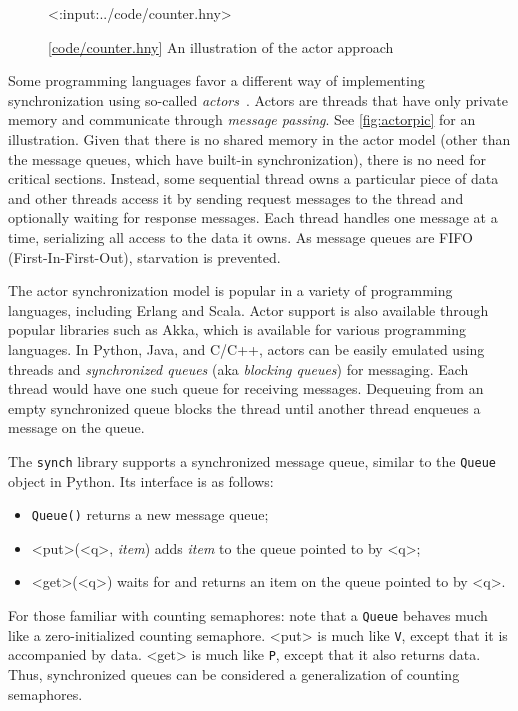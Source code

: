 \documentclass{report}
\newcommand{\harmonylink}[1]{%
[\href{https://harmony.cs.cornell.edu/#1}{\underline{#1}}]%
}
\newenvironment{code}{
\tcolorbox
}{
\endtcolorbox
}
\begin{document}
{\begin{figure}
\begin{code}
<{:input:../code/counter.hny}>
\end{code}
\caption{\harmonylink{code/counter.hny} An illustration of the actor approach}
\label{fig:actor}
\end{figure}

Some programming languages favor a different way of implementing
synchronization using so-called \emph{actors}~\cite{HBS73,Agha86}.  Actors are
threads that have only private memory and communicate through
\emph{message passing}.
See \autoref{fig:actorpic} for an illustration.
Given that there is no shared memory in the actor model (other than the message
queues, which have built-in synchronization), there is no need
for critical sections.  Instead, some sequential thread owns a particular
piece of data and other threads access it by sending request messages
to the thread and optionally waiting for response messages.  Each thread
handles one message at a time, serializing all access to the data it owns.
As message queues are FIFO (First-In-First-Out), starvation is prevented.

The actor synchronization model is popular in a variety of programming
languages, including Erlang and Scala.  Actor support is also available
through popular libraries such as Akka, which is available for various
programming languages.  In Python, Java, and C/C++,
actors can be easily emulated using threads and \emph{synchronized queues}
%
(aka \emph{blocking queues})
%
for messaging.
Each thread would have one such queue for receiving messages.
Dequeuing from an empty synchronized queue blocks the thread until
another thread enqueues a message on the queue.

The \texttt{synch} library supports a synchronized message queue,
similar to the \texttt{Queue} object in Python.
Its interface is as follows:
\begin{itemize}
\item \texttt{Queue()} returns a new message queue;
\item <{put}>(<{q}>, \textit{item}) adds \textit{item} to the queue pointed to by <{q}>;
\item <{get}>(<{q}>) waits for and returns an item on the queue pointed to by <{q}>.
\end{itemize}

For those familiar with counting semaphores: note that a \texttt{Queue}
behaves much like a zero-initialized counting semaphore.
<{put}> is much like \texttt{V}, except that it is accompanied by data.
<{get}> is much like \texttt{P}, except that it also returns data.
Thus, synchronized queues can be considered a generalization of
counting semaphores.

}
\end{document}
